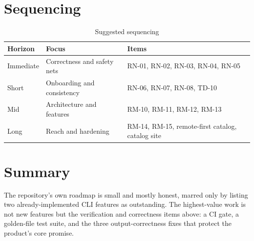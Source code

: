 \section{Sequencing}

\begin{table}[H]
\centering
\caption{Suggested sequencing}
\begin{tabular}{p{5.6cm}p{4.2cm}p{4.4cm}}
\toprule
\textbf{Horizon} & \textbf{Focus} & \textbf{Items} \\
\midrule
Immediate & Correctness and safety nets & RN-01, RN-02, RN-03, RN-04, RN-05 \\
Short & Onboarding and consistency & RN-06, RN-07, RN-08, TD-10 \\
Mid & Architecture and features & RM-10, RM-11, RM-12, RM-13 \\
Long & Reach and hardening & RM-14, RM-15, remote-first catalog, catalog site \\
\bottomrule
\end{tabular}
\end{table}

\section{Summary}

The repository's own roadmap is small and mostly honest, marred only by listing
two already-implemented CLI features as outstanding. The highest-value work is
not new features but the verification and correctness items above: a CI gate, a
golden-file test suite, and the three output-correctness fixes that protect the
product's core promise.
